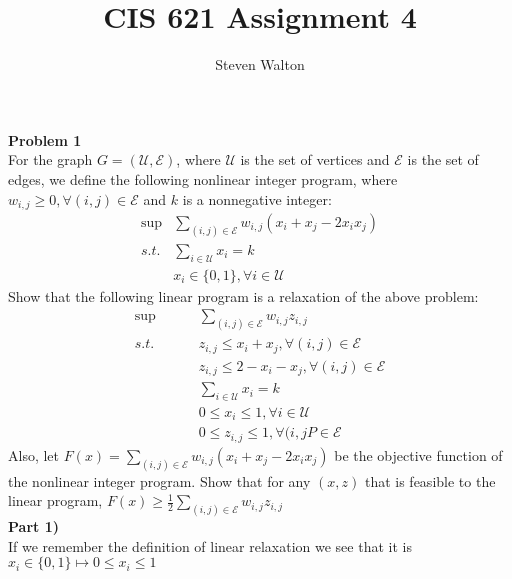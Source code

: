 \documentclass[12pt,letter]{article}
\newcommand{\problem}[1]{\vspace{3mm}\Large\textbf{{Problem {#1}\vspace{3mm}}}\normalsize\\}
\newcommand{\ppart}[1]{\vspace{2mm}\large\textbf{\\Part {#1})\vspace{2mm}}\normalsize\\}
\begin{document}
\title{CIS 621 Assignment 4}
\author{Steven Walton}
\maketitle
\problem{1}
For the graph $G=(\mathcal{U},\mathcal{E})$, where $\mathcal{U}$ is the set of 
vertices and $\mathcal{E}$ is the set of edges, we define the following
nonlinear integer program, where $w_{i,j}\geq0, \forall(i,j)\in\mathcal{E}$ and 
$k$ is a nonnegative integer:
\begin{align*}
    \sup&\sum\limits_{(i,j)\in\mathcal{E}} w_{i,j}(x_i + x_j - 2x_ix_j)\\
    s.t. & \sum\limits_{i\in\mathcal{U}}x_i = k\\
       & x_i\in\{0,1\}, \forall i \in\mathcal{U}
\end{align*}
Show that the following linear program is a relaxation of the above problem:
\begin{align*}
    \sup&\sum\limits_{(i,j)\in\mathcal{E}} w_{i,j}z_{i,j}\\
     s.t.\hspace{1cm} & z_{i,j}\leq x_i + x_j, \forall(i,j)\in\mathcal{E}\\
     & z_{i,j}\leq 2 - x_i - x_j, \forall(i,j) \in \mathcal{E}\\
     & \sum\limits_{i\in\mathcal{U}}x_i = k\\
     & 0 \leq x_i \leq 1, \forall i \in\mathcal{U}\\
     & 0 \leq z_{i,j} \leq 1, \forall(i,jP\in\mathcal{E}
\end{align*}
Also, let $F(x)=\sum\limits_{(i,j)\in\mathcal{E}}w_{i,j}(x_i + x_j - 2x_ix_j)$ be
the objective function of the nonlinear integer program. Show that for any 
$(x,z)$ that is feasible to the linear program, 
$F(x)\geq\frac12\sum\limits_{(i,j)\in\mathcal{E}}w_{i,j}z_{i,j}$
\ppart{1}
If we remember the definition of linear relaxation we see that it is
$x_i\in\{0,1\} \mapsto 0\leq x_i \leq 1$
\end{document}
